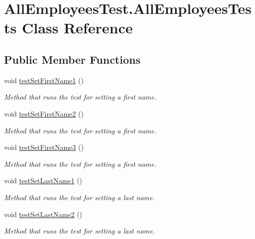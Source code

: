 \hypertarget{class_all_employees_test_1_1_all_employees_tests}{}\section{All\+Employees\+Test.\+All\+Employees\+Tests Class Reference}
\label{class_all_employees_test_1_1_all_employees_tests}
\subsection*{Public Member Functions}
\begin{DoxyCompactItemize}
\item 
void \hyperlink{class_all_employees_test_1_1_all_employees_tests_a3db11ba770f479dcd1203dc457e87f1d}{test\+Set\+First\+Name1} ()
\begin{DoxyCompactList}\small\item\em Method that runs the test for setting a first name. \end{DoxyCompactList}\item 
void \hyperlink{class_all_employees_test_1_1_all_employees_tests_ace8bb1fef62ac40a5852d094ab395792}{test\+Set\+First\+Name2} ()
\begin{DoxyCompactList}\small\item\em Method that runs the test for setting a first name. \end{DoxyCompactList}\item 
void \hyperlink{class_all_employees_test_1_1_all_employees_tests_a76c9d76d17e5707b57dbb9d9dc5a4cbe}{test\+Set\+First\+Name3} ()
\begin{DoxyCompactList}\small\item\em Method that runs the test for setting a first name. \end{DoxyCompactList}\item 
void \hyperlink{class_all_employees_test_1_1_all_employees_tests_aefb7dab32bda67b058e8195ff4de9a72}{test\+Set\+Last\+Name1} ()
\begin{DoxyCompactList}\small\item\em Method that runs the test for setting a last name. \end{DoxyCompactList}\item 
void \hyperlink{class_all_employees_test_1_1_all_employees_tests_a49647f7398bac295df891a2306cdeb6e}{test\+Set\+Last\+Name2} ()
\begin{DoxyCompactList}\small\item\em Method that runs the test for setting a last name. \end{DoxyCompactList}\item 

\end{DoxyCompactItemize}
